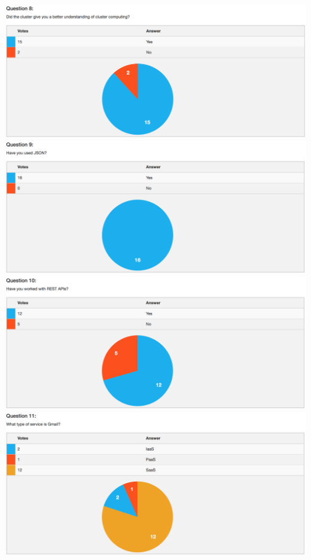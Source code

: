 \includegraphics[width=14cm]{figures/votiee/w1q8}\\
\includegraphics[width=14cm]{figures/votiee/w1q9}\\
\includegraphics[width=14cm]{figures/votiee/w1q10}\\
\includegraphics[width=14cm]{figures/votiee/w1q11}\\
